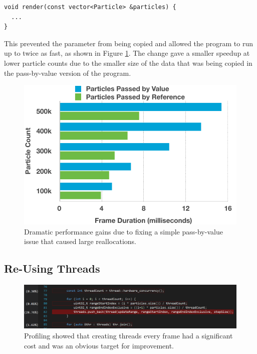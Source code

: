 \documentclass[11pt, a4paper, twocolumn]{article}
\begin{document}
\begin{verbatim}
void render(const vector<Particle> &particles) {
  ...
}
\end{verbatim}

This prevented the parameter from being copied and allowed the program to run up to twice as fast, as shown in Figure \ref{fig:pass-by-value-reference}. The change gave a smaller speedup at lower particle counts due to the smaller size of the data that was being copied in the pass-by-value version of the program.

\begin{figure}[h]
\includegraphics[width=\linewidth]{pass-by-value-reference}
\caption{Dramatic performance gains due to fixing a simple pass-by-value issue that caused large reallocations.}
\label{fig:pass-by-value-reference}
\end{figure}

\subsection{Re-Using Threads} \label{sec:threadreuse}

\begin{figure}[h]
\includegraphics[width=\linewidth]{thread-create}
\caption{Profiling showed that creating threads every frame had a significant cost and was an obvious target for improvement.}
\label{fig:thread-create}
\end{figure}
\end{document}
